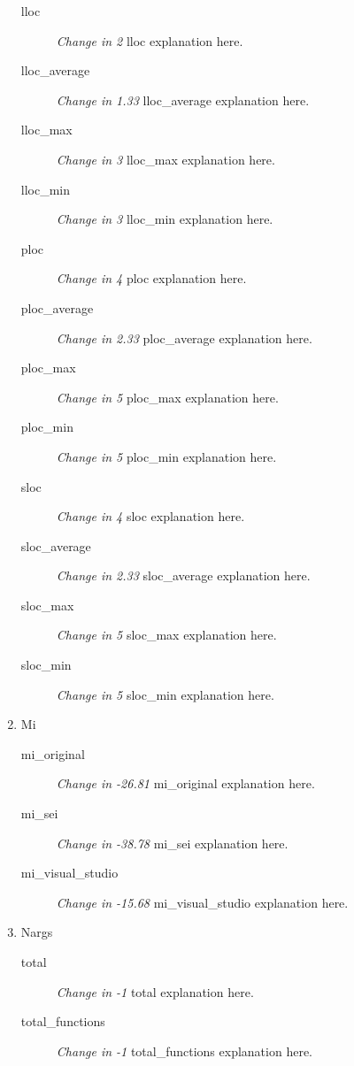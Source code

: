 \begin{enumerate}
            \begin{description}
                  \item [lloc] \textit{Change in 2} lloc explanation here.
                  \item [lloc\_average] \textit{Change in 1.33} lloc\_average explanation here.
                  \item [lloc\_max] \textit{Change in 3} lloc\_max explanation here.
                  \item [lloc\_min] \textit{Change in 3} lloc\_min explanation here.
                  \item [ploc] \textit{Change in 4} ploc explanation here.
                  \item [ploc\_average] \textit{Change in 2.33} ploc\_average explanation here.
                  \item [ploc\_max] \textit{Change in 5} ploc\_max explanation here.
                  \item [ploc\_min] \textit{Change in 5} ploc\_min explanation here.
                  \item [sloc] \textit{Change in 4} sloc explanation here.
                  \item [sloc\_average] \textit{Change in 2.33} sloc\_average explanation here.
                  \item [sloc\_max] \textit{Change in 5} sloc\_max explanation here.
                  \item [sloc\_min] \textit{Change in 5} sloc\_min explanation here.
            \end{description}
      \item Mi
            \begin{description}
                  \item [mi\_original] \textit{Change in -26.81} mi\_original explanation here.
                  \item [mi\_sei] \textit{Change in -38.78} mi\_sei explanation here.
                  \item [mi\_visual\_studio] \textit{Change in -15.68} mi\_visual\_studio explanation here.
            \end{description}
      \item Nargs
            \begin{description}
                  \item [total] \textit{Change in -1} total explanation here.
                  \item [total\_functions] \textit{Change in -1} total\_functions explanation here.

\end{description}
\end{enumerate}
